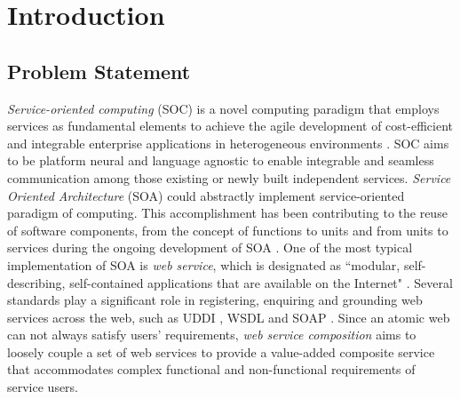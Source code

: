 \chapter{Introduction}\label{C:intro}

\section{Problem Statement}
\emph{Service-oriented computing} (SOC) is a novel computing paradigm that employs services as fundamental elements to achieve the agile development of cost-efficient and integrable enterprise applications in heterogeneous environments \cite{papazoglou2003service, papazoglou2006p}. SOC aims to be platform neural and language agnostic to enable integrable and seamless communication among those existing or newly built independent services. \emph{Service Oriented Architecture} (SOA)  could abstractly implement service-oriented paradigm of computing. This accomplishment has been contributing to the reuse of software components, from the concept of functions to units and from units to services during the ongoing development of SOA \cite{booth2004web, overdick2007resource}. One of the most typical implementation of SOA is \emph{web service}, which is designated as ``modular, self-describing, self-contained applications that are available on the Internet" \cite{curbera2001web}. Several standards play a significant role in registering, enquiring and grounding web services across the web, such as UDDI \cite{curbera2002unraveling}, WSDL \cite{lausen2007semantic} and SOAP \cite{fensel2011semantic}. Since an atomic web can not always satisfy users' requirements, \emph{web service composition} aims to loosely couple a set of web services to provide a value-added composite service that accommodates complex functional and non-functional requirements of service users. 

